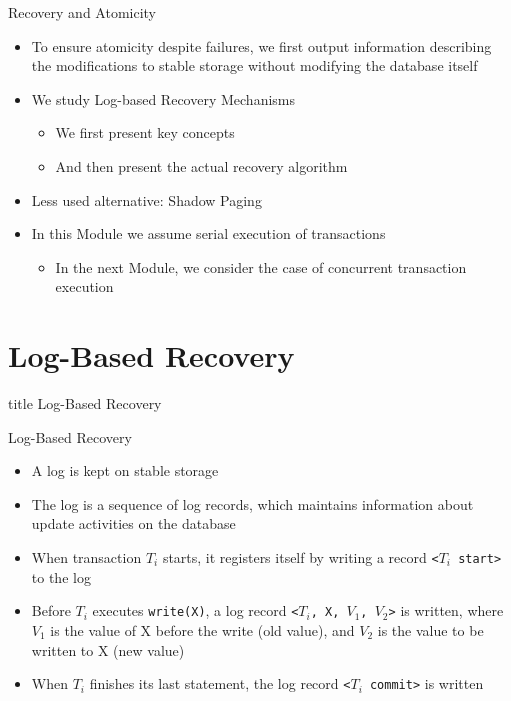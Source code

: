 \documentclass[aspectratio=169, xcolor=dvipsnames]{beamer}
\begin{document}
\begin{frame}{Recovery and Atomicity}
    \begin{itemize}[<+->]
        \item To ensure atomicity despite failures, we first output information describing the modifications to stable storage without modifying the database itself
        \item We study Log-based Recovery Mechanisms
        \begin{itemize}
            \item[$\triangleright$] We first present key concepts
            \item[$\triangleright$] And then present the actual recovery algorithm
        \end{itemize}
        \item Less used alternative: Shadow Paging
        \item In this Module we assume serial execution of transactions
        \begin{itemize}
            \item[$\triangleright$] In the next Module, we consider the case of concurrent transaction execution
        \end{itemize}
    \end{itemize}
\end{frame}

\section{Log-Based Recovery}

\begin{frame}
  \vfill
  \centering
  \begin{beamercolorbox}[sep=8pt,center,shadow=true,rounded=true]{title}
    Log-Based Recovery\par%
  \end{beamercolorbox}
  \vfill
\end{frame}

\begin{frame}{Log-Based Recovery}
    \begin{itemize}[<+->]
        \item A log is kept on stable storage
        \item The log is a sequence of log records, which maintains information about update activities on the database
        \item When transaction $T_i$ starts, it registers itself by writing a record \texttt{<$T_i$ start>} to the log
        \item Before $T_i$ executes \texttt{write(X)}, a log record \texttt{<$T_i$, X, $V_1$, $V_2$>} is written, where $V_1$ is the value of X before the write (old value), and $V_2$ is the value to be written to X (new value)
        \item When $T_i$ finishes its last statement, the log record \texttt{<$T_i$ commit>} is written
    \end{itemize}
\end{frame}
\end{document}
